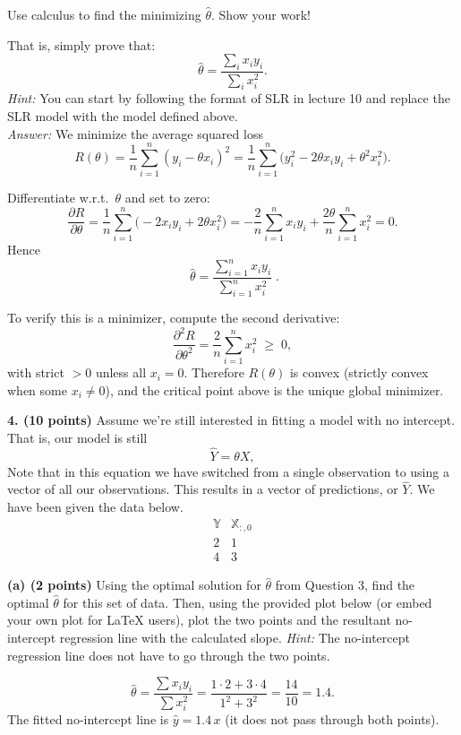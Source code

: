 \documentclass[11pt]{article}
\begin{document}
Use calculus to find the minimizing $\hat{\theta}$. Show your work!

That is, simply prove that:
\[
\hat{\theta}=\frac{\sum_i x_i y_i}{\sum_i x_i^2}.
\]
\textit{Hint:} You can start by following the format of SLR in lecture 10 and replace the SLR model with the model defined above.
\medskip
\\\noindent\textit{Answer:} We minimize the average squared loss
\[
R(\theta)=\frac{1}{n}\sum_{i=1}^n (y_i-\theta x_i)^2
= \frac{1}{n}\sum_{i=1}^n \big(y_i^2 - 2\theta x_i y_i + \theta^2 x_i^2\big).
\]

Differentiate w.r.t.\ $\theta$ and set to zero:
\[
\frac{\partial R}{\partial \theta}
= \frac{1}{n}\sum_{i=1}^n \big(-2 x_i y_i + 2\theta x_i^2\big)
= -\frac{2}{n}\sum_{i=1}^n x_i y_i + \frac{2\theta}{n}\sum_{i=1}^n x_i^2
= 0.
\]
Hence
\[
\boxed{\;\hat\theta
= \frac{\sum_{i=1}^n x_i y_i}{\sum_{i=1}^n x_i^2}\; }.
\]

To verify this is a minimizer, compute the second derivative:
\[
\frac{\partial^2 R}{\partial \theta^2}
= \frac{2}{n}\sum_{i=1}^n x_i^2 \;\ge\; 0,
\]
with strict $>0$ unless all $x_i=0$. Therefore $R(\theta)$ is convex (strictly convex 
when some $x_i\neq0$), and the critical point above is the unique global minimizer.

\bigskip
\newpage
\noindent \textbf{4. (10 points)} Assume we’re still interested in fitting a model with no intercept. That is, our model is still
\[
\hat{Y}=\theta X,
\]
Note that in this equation we have switched from a single observation to using a vector of all our observations. This results in a vector of predictions, or $\hat{Y}$. We have been given the data below.
\[
\begin{array}{cc}
\mathbb{Y}  & \mathbb{X}_{:,0}\\
\hline
2 & 1\\
4 & 3
\end{array}
\]

\medskip
\noindent \textbf{(a) (2 points)} Using the optimal solution for $\hat{\theta}$ from Question 3, find the optimal $\hat{\theta}$ for this set of data. Then, using the provided plot below (or embed your own plot for \LaTeX{} users), plot the two points and the resultant no-intercept regression line with the calculated slope. \textit{Hint:} The no-intercept regression line does not have to go through the two points.

\[
\hat\theta=\frac{\sum x_i y_i}{\sum x_i^2}=\frac{1\cdot 2+3\cdot 4}{1^2+3^2}=\frac{14}{10}= \boxed{1.4}.
\]
The fitted no-intercept line is $\boxed{\hat y=1.4\,x}$ (it does not pass through both points).
\end{document}

